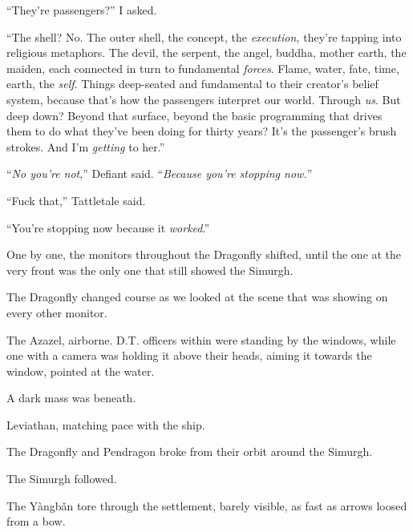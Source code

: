 ``They're passengers?'' I asked.



``The shell?  No.  The outer shell, the concept, the \emph{execution, }they're tapping into religious metaphors.  The devil, the serpent, the angel, buddha, mother earth, the maiden, each connected in turn to fundamental \emph{forces}.  Flame, water, fate, time, earth, the \emph{self}.  Things deep-seated and fundamental to their creator's belief system, because that's how the passengers interpret our world.  Through \emph{us}.  But deep down?  Beyond that surface, beyond the basic programming that drives them to do what they've been doing for thirty years?  It's the passenger's brush strokes.  And I'm \emph{getting} to her.''



``\emph{No you're not},'' Defiant said.  ``\emph{Because you're stopping now.}''



``Fuck that,'' Tattletale said.



``You're stopping now because it \emph{worked}.''



One by one, the monitors throughout the Dragonfly shifted, until the one at the very front was the only one that still showed the Simurgh.



The Dragonfly changed course as we looked at the scene that was showing on every other monitor.



The Azazel, airborne.  D.T. officers within were standing by the windows, while one with a camera was holding it above their heads, aiming it towards the window, pointed at the water.



A dark mass was beneath.



Leviathan, matching pace with the ship.



The Dragonfly and Pendragon broke from their orbit around the Simurgh.



The Simurgh followed.



\sectionbreak



The Y\`{a}ngb\v{a}n tore through the settlement, barely visible, as fast as arrows loosed from a bow.



